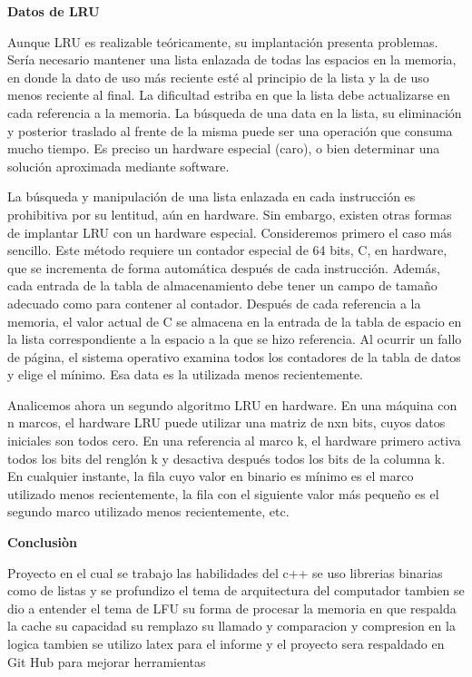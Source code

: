 \documentclass{report}
\begin{document}
\begin{titlepage}
{\bfseries\LARGE  Datos de LRU  \par}\par
\par
Aunque LRU es realizable teóricamente, su implantación presenta problemas. Sería necesario mantener una lista enlazada de todas las espacios en la memoria, en donde la dato de uso más reciente esté al principio de la lista y la de uso menos reciente al final. La dificultad estriba en que la lista debe actualizarse en cada referencia a la memoria. La búsqueda de una data en la lista, su eliminación y posterior traslado al frente de la misma puede ser una operación que consuma mucho tiempo. Es preciso un hardware especial (caro), o bien determinar una solución aproximada mediante software.

La búsqueda y manipulación de una lista enlazada en cada instrucción es prohibitiva por su lentitud, aún en hardware. Sin embargo, existen otras formas de implantar LRU con un hardware especial. Consideremos primero el caso más sencillo. Este método requiere un contador especial de 64 bits, C, en hardware, que se incrementa de forma automática después de cada instrucción. Además, cada entrada de la tabla de almacenamiento debe tener un campo de tamaño adecuado como para contener al contador. Después de cada referencia a la memoria, el valor actual de C se almacena en la entrada de la tabla de espacio en la lista correspondiente a la espacio a la que se hizo referencia. Al ocurrir un fallo de página, el sistema operativo examina todos los contadores de la tabla de datos y elige el mínimo. Esa data es la utilizada menos recientemente.

Analicemos ahora un segundo algoritmo LRU en hardware. En una máquina con n marcos, el hardware LRU puede utilizar una matriz de nxn bits, cuyos datos iniciales son todos cero. En una referencia al marco k, el hardware primero activa todos los bits del renglón k y desactiva después todos los bits de la columna k. En cualquier instante, la fila cuyo valor en binario es mínimo es el marco utilizado menos recientemente, la fila con el siguiente valor más pequeño es el segundo marco utilizado menos recientemente, etc. 

\end{titlepage}

\begin{titlepage}
{\bfseries\LARGE        Conclusiòn \par}\par
\par
Proyecto en el cual se trabajo las habilidades del c++ se uso librerias binarias como de listas y se profundizo el tema de arquitectura del computador tambien se dio a entender el tema de LFU su forma de procesar la memoria en que respalda la cache su capacidad su remplazo  su llamado y comparacion y compresion en la logica tambien se utilizo  latex para el informe y el proyecto sera respaldado en Git Hub para mejorar herramientas 

 \end{titlepage}
\end{document}
